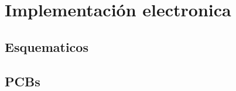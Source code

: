 \chapter[Implementacion Electronica]{Implementación electronica}
\label{cp:Electronica}
{
\section{Esquematicos}

\section{PCBs}

}